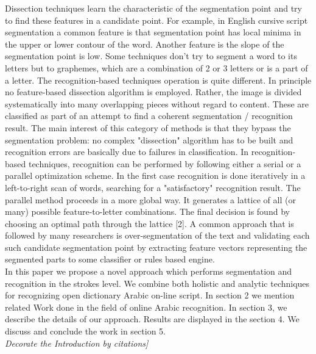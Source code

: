\documentclass[12pt,journal,compsoc]{IEEEtran}
\begin{document}
Dissection techniques learn the characteristic of the segmentation point and try to find these features in a candidate point. For example, in English cursive script segmentation a common feature is that segmentation point has local minima in the upper or lower contour of the word. Another feature is the slope of the segmentation point is low. Some techniques don't try to segment a word to its letters but to graphemes, which are a combination of 2 or 3 letters or is a part of a letter. The recognition-based techniques operation is quite different. In principle no feature-based dissection algorithm is employed. Rather, the image is divided systematically into many overlapping pieces without regard to content. These are classified as part of an attempt to find a coherent segmentation / recognition result. The main interest of this category of methods is that they bypass the segmentation problem: no complex "dissection" algorithm has to be built and recognition errors are basically due to failures in classification. In recognition-based techniques, recognition can be performed by following either a serial or a parallel optimization scheme. In the first case recognition is done iteratively in a left-to-right scan of words, searching for a "satisfactory" recognition result. The parallel method proceeds in a more global way. It generates a lattice of all (or many) possible feature-to-letter combinations. The final decision is found by choosing an optimal path through the lattice [2]. A common approach that is followed by many researchers is over-segmentation of the text and validating each such candidate segmentation point by extracting feature vectors representing the segmented parts to some classifier or rules based engine.\cite{daifallah2009recognition}\\

In this paper we propose a novel approach which performs segmentation and recognition in the strokes level. We combine both holistic and analytic techniques for recognizing open dictionary Arabic on-line script. In section 2 we mention related Work done in the field of online Arabic recognition. In section 3, we describe the details of our approach. Results are displayed in the section 4. We discuss and conclude the work in section 5.
\\ \emph{Decorate the Introduction by citations]}
\end{document}
